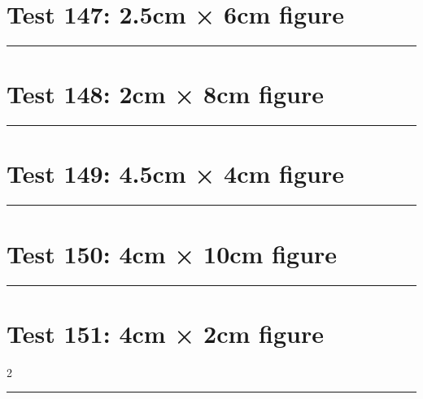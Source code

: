 \documentclass[a4paper,11pt]{article}
\begin{document}
\section*{Test 147: 2.5cm × 6cm figure}
\begin{swarmwrap}%
  \begin{minipage}[t]{2cm}
    \centering
    \rule{\linewidth}{6cm}
  \end{minipage}%
\end{swarmwrap}%
\swarmwrapnext
\lipsum[126]
\lipsum[127]
\lipsum[128]
\lipsum[129]
\lipsum[130]
\lipsum[131]
\section*{Test 148: 2cm × 8cm figure}
\begin{swarmwrap}%
  \begin{minipage}[t]{2cm}
    \centering
    \rule{\linewidth}{8cm}
  \end{minipage}%
\end{swarmwrap}%
\swarmwrapnext
\lipsum[105]
\lipsum[106]
\lipsum[107]
\lipsum[108]
\lipsum[109]
\section*{Test 149: 4.5cm × 4cm figure}
\begin{swarmwrap}%
  \begin{minipage}[t]{4cm}
    \centering
    \rule{\linewidth}{4cm}
  \end{minipage}%
\end{swarmwrap}%
\swarmwrapnext
\lipsum[34]
\lipsum[35]
\lipsum[36]
\lipsum[37]
\lipsum[38]
\lipsum[39]
\section*{Test 150: 4cm × 10cm figure}
\begin{swarmwrap}%
  \begin{minipage}[t]{4cm}
    \centering
    \rule{\linewidth}{10cm}
  \end{minipage}%
\end{swarmwrap}%
\swarmwrapnext
\lipsum[102]
\lipsum[103]
\lipsum[104]
\section*{Test 151: 4cm × 2cm figure}
\begin{multicols}{2}
  \begin{swarmwrap}%
    \begin{minipage}[t]{4cm}
      \centering
      \rule{\linewidth}{2cm}
    \end{minipage}%
  \end{swarmwrap}%
  \swarmwrapnext
  \lipsum[111]
  \lipsum[112]
  \lipsum[113]
\end{multicols}
\end{document}
